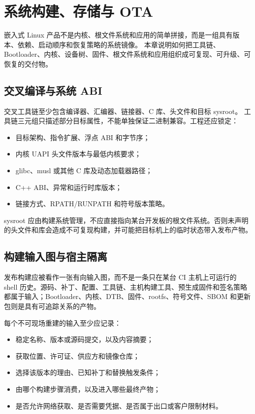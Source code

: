 \chapter{系统构建、存储与 OTA}
\label{chap:system-build-update}

嵌入式 Linux 产品不是内核、根文件系统和应用的简单拼接，而是一组具有版本、依赖、启动顺序和恢复策略的系统镜像。
本章说明如何把工具链、Bootloader、内核、设备树、固件、根文件系统和应用组织成可复现、可升级、可恢复的交付物。

\section{交叉编译与系统 ABI}

交叉工具链至少包含编译器、汇编器、链接器、C 库、头文件和目标 sysroot。
工具链三元组只描述部分目标属性，不能单独保证二进制兼容。工程还应锁定：
\begin{itemize}
  \item 目标架构、指令扩展、浮点 ABI 和字节序；
  \item 内核 UAPI 头文件版本与最低内核要求；
  \item glibc、musl 或其他 C 库及动态加载器路径；
  \item C++ ABI、异常和运行时库版本；
  \item 链接方式、RPATH/RUNPATH 和符号版本策略。
\end{itemize}

sysroot 应由构建系统管理，不应直接指向某台开发板的根文件系统。否则未声明的头文件和库会造成不可复现构建，并可能把目标机上的临时状态带入发布产物。

\section{构建输入图与宿主隔离}

发布构建应被看作一张有向输入图，而不是一条只在某台 CI 主机上可运行的 shell 历史。源码、补丁、配置、工具链、主机构建工具、预生成固件和签名策略都属于输入；Bootloader、内核、DTB、固件、rootfs、符号文件、SBOM 和更新包则是具有可追踪关系的产物。

每个不可现场重建的输入至少应记录：
\begin{itemize}
  \item 稳定名称、版本或源码提交，以及内容摘要；
  \item 获取位置、许可证、供应方和镜像仓库；
  \item 选择该版本的理由、已知补丁和替换触发条件；
  \item 由哪个构建步骤消费，以及进入哪些最终产物；
  \item 是否允许网络获取、是否需要凭据、是否属于出口或客户限制材料。
\end{itemize}

